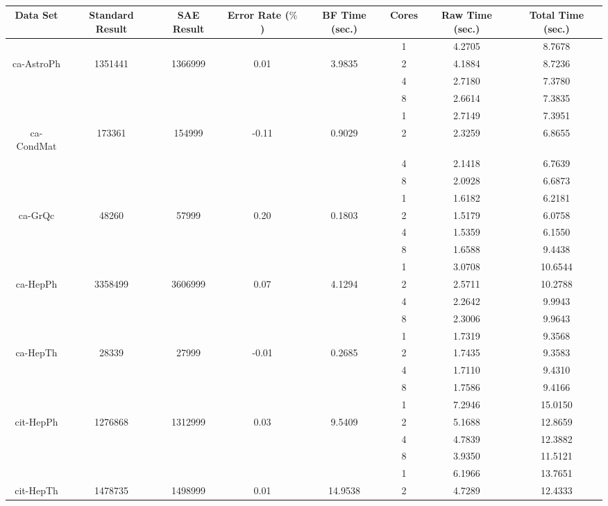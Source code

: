 \documentclass[11pt]{report}
\begin{document}
\begin{table}[t]
\caption{}
{
\label {tb:kl}
\centering
\renewcommand\arraystretch{1.2}
\begin{tabular}{@{}c|c|c|c|c|c|c|c}
\hline
{Data Set} & {Standard Result} & {SAE Result} & {Error Rate ($\%$)} & {BF Time (sec.)} & {Cores} & {Raw Time (sec.)} & {Total Time (sec.)}\\
\hline
& & & & & 1 & 4.2705 & 8.7678 \\
ca-AstroPh & 1351441 & 1366999 & 0.01 & 3.9835 & 2 & 4.1884 & 8.7236 \\
& & & & & 4 & 2.7180 & 7.3780 \\
& & & & & 8 & 2.6614 & 7.3835 \\
\hline
& & & & & 1 & 2.7149 & 7.3951 \\
ca-CondMat & 173361 & 154999 & -0.11 & 0.9029 & 2 & 2.3259 & 6.8655 \\
& & & & & 4 & 2.1418 & 6.7639 \\
& & & & & 8 & 2.0928 & 6.6873 \\
\hline
& & & & & 1 & 1.6182 & 6.2181 \\
ca-GrQc & 48260 & 57999 & 0.20 & 0.1803 & 2 & 1.5179 & 6.0758 \\
& & & & & 4 & 1.5359 & 6.1550 \\
& & & & & 8 & 1.6588 & 9.4438 \\
\hline
& & & & & 1 & 3.0708 & 10.6544 \\
ca-HepPh & 3358499 & 3606999 & 0.07 & 4.1294 & 2 & 2.5711 & 10.2788 \\
& & & & & 4 & 2.2642 & 9.9943 \\
& & & & & 8 & 2.3006 & 9.9643 \\
\hline
& & & & & 1 & 1.7319 & 9.3568 \\
ca-HepTh & 28339 & 27999 & -0.01 & 0.2685 & 2 & 1.7435 & 9.3583 \\
& & & & & 4 & 1.7110 & 9.4310 \\
& & & & & 8 & 1.7586 & 9.4166 \\
\hline
& & & & & 1 & 7.2946 & 15.0150 \\
cit-HepPh & 1276868 & 1312999 & 0.03 & 9.5409 & 2 & 5.1688 & 12.8659 \\
& & & & & 4 & 4.7839 & 12.3882 \\
& & & & & 8 & 3.9350 & 11.5121 \\
\hline
& & & & & 1 & 6.1966 & 13.7651 \\
cit-HepTh & 1478735 & 1498999 & 0.01 & 14.9538 & 2 & 4.7289 & 12.4333 \\

\end{tabular}}
\end{table}
\end{document}

